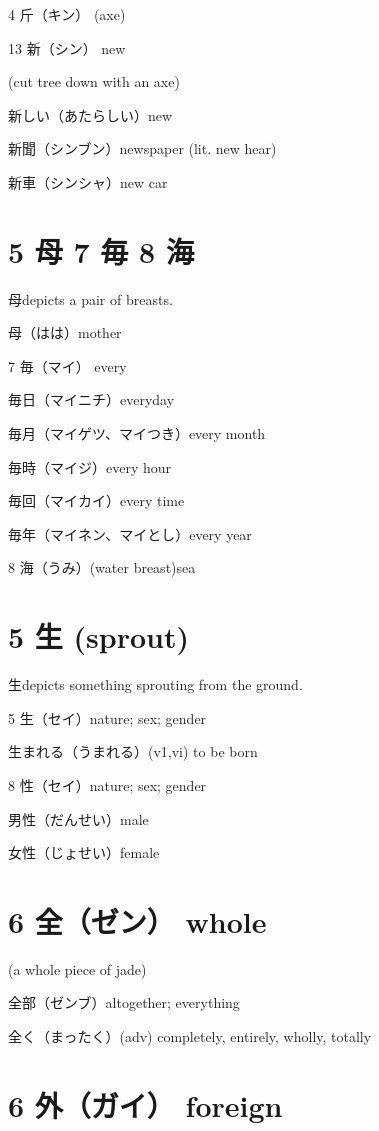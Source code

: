 4 斤（キン） (axe)

13 新（シン） new

(cut tree down with an axe)

新しい（あたらしい）new

新聞（シンブン）newspaper (lit. new hear)

新車（シンシャ）new car

\section{5 母 7 毎 8 海}

母depicts a pair of breasts.

母（はは）mother

7 毎（マイ） every

毎日（マイニチ）everyday

毎月（マイゲツ、マイつき）every month

毎時（マイジ）every hour

毎回（マイカイ）every time

毎年（マイネン、マイとし）every year

8 海（うみ）(water breast)sea

\section{5 生 (sprout)}

生depicts something sprouting from the ground.

5 生（セイ）nature; sex; gender

生まれる（うまれる）(v1,vi) to be born

8 性（セイ）nature; sex; gender

男性（だんせい）male

女性（じょせい）female

\section{6 全（ゼン） whole}

(a whole piece of jade)

全部（ゼンブ）altogether; everything

全く（まったく）(adv) completely, entirely, wholly, totally

\section{6 外（ガイ） foreign}

